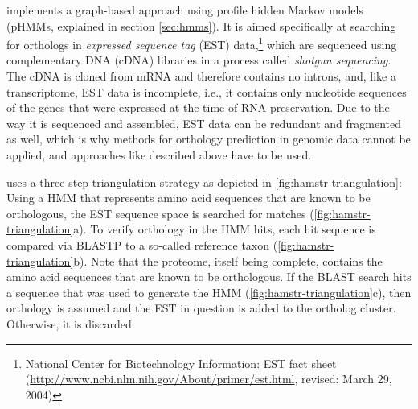\hamstr implements a graph-based approach using profile hidden Markov models
(pHMMs, explained in section \ref{sec:hmms}). It is aimed specifically at
searching for orthologs in \emph{expressed sequence tag} (EST)
data,\footnote{National Center for Biotechnology Information: EST fact sheet
(\url{http://www.ncbi.nlm.nih.gov/About/primer/est.html}, revised: March 29,
2004)} which are sequenced using complementary DNA (cDNA) libraries in a process
called \emph{shotgun sequencing}. The cDNA is cloned from mRNA and therefore
contains no introns, and, like a transcriptome, EST data is incomplete, i.e., it
contains only nucleotide sequences of the genes that were expressed at the time
of RNA preservation. Due to the way it is sequenced and assembled, EST data can
be redundant and fragmented as well, which is why methods for orthology prediction in
genomic data cannot be applied, and approaches like described above have to be
used.

\hamstr uses a three-step triangulation strategy as depicted in
\autoref{fig:hamstr-triangulation}: Using a HMM that represents amino acid
sequences that are known to be orthologous, the EST sequence space is
searched for matches (\autoref{fig:hamstr-triangulation}a). To verify orthology
in the HMM hits, each hit sequence is compared via BLASTP \citep{altschul1997}
to a so-called reference taxon (\autoref{fig:hamstr-triangulation}b). Note that
the proteome, itself being complete, contains the amino acid sequences that are
known to be orthologous. If the BLAST search hits a sequence that was used to
generate the HMM (\autoref{fig:hamstr-triangulation}c), then orthology is assumed
and the EST in question is added to the ortholog cluster. Otherwise, it is
discarded.



%

